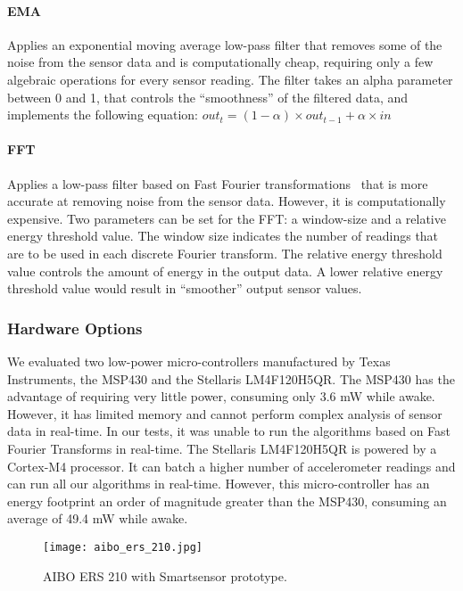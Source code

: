   \paragraph{EMA} Applies an exponential moving average low-pass
  filter that removes some of the noise from the sensor data and is
  computationally cheap, requiring only a few algebraic operations for
  every sensor reading. The filter takes an alpha parameter between 0
  and 1, that controls the ``smoothness'' of the filtered data, and
  implements the following equation: $out_{t} = (1-\alpha) \times
  out_{t-1} + \alpha \times in$

  \paragraph{FFT} Applies a low-pass filter based on Fast Fourier
  transformations~\cite{libbyFootstepDetection} that is more accurate
  at removing noise from the sensor data. However, it is
  computationally expensive. Two parameters can be set for the
  FFT: a window-size and a relative energy threshold value. The
  window size indicates the number of readings that are to be used in
  each discrete Fourier transform. The relative energy threshold value
  controls the amount of energy in the output data. A lower relative
  energy threshold value would result in ``smoother'' output sensor
  values.
\fi

\subsubsection{Hardware Options}

We evaluated two low-power micro-controllers manufactured by Texas
Instruments, the MSP430 and the Stellaris LM4F\-120H5QR.  The MSP430 has
the advantage of requiring very little power, consuming only 3.6 mW
while awake.  However, it has limited memory and cannot perform complex
analysis of sensor data in real-time.  In our tests, it was unable to
run the algorithms based on Fast Fourier Transforms in real-time.  
The Stellaris LM4F120H5QR is powered by a Cortex-M4 processor.  It can 
batch a higher number of accelerometer
readings and can run all our algorithms in real-time.  However, this
micro-controller has an energy footprint an order of magnitude greater
than the MSP430, consuming an average of 49.4 mW while awake.

\begin{figure}[t]
	\centering
	\texttt{[image: aibo\_ers\_210.jpg]}
	\caption{AIBO ERS 210 with Smartsensor prototype.}
	\label{fig:aibo}
\end{figure}

